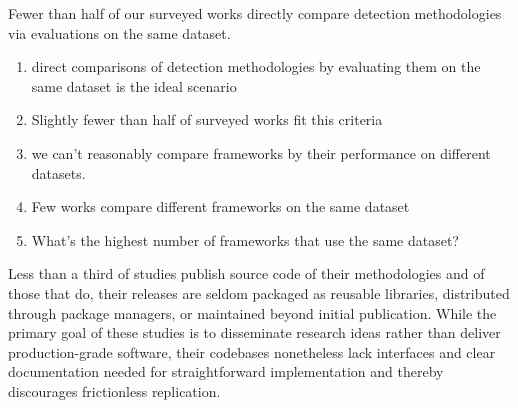 \documentclass[manuscript,nonacm]{acmart}
\begin{document}
Fewer than half of our surveyed works directly compare detection methodologies via evaluations on the same dataset.



\begin{enumerate}
    \item direct comparisons of detection methodologies by evaluating them on the same dataset is the ideal scenario
    \item Slightly fewer than half of surveyed works fit this criteria
	\item we can't reasonably compare frameworks by their performance on different datasets.
	\item Few works compare different frameworks on the same dataset
	\item What's the highest number of frameworks that use the same dataset?
\end{enumerate}

Less than a third of studies publish source code of their methodologies and of those that do, their releases are seldom packaged as reusable libraries, distributed through package managers, or maintained beyond initial publication. 
While the primary goal of these studies is to disseminate research ideas rather than deliver production-grade software, their codebases nonetheless lack interfaces and clear documentation needed for straightforward implementation and thereby discourages frictionless replication.
\end{document}
